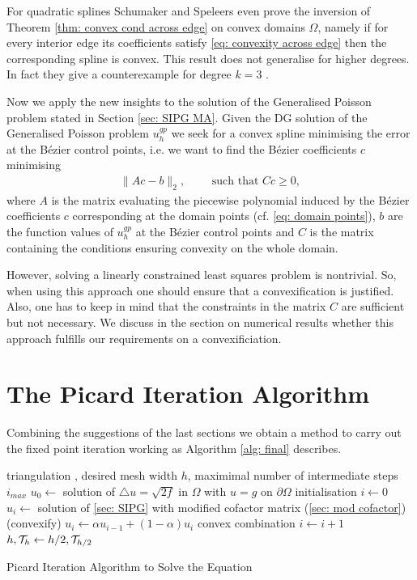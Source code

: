 For quadratic splines Schumaker and Speleers even prove the inversion of Theorem \ref{thm: convex cond across edge} on convex domains $\Omega$, namely if for every interior edge its coefficients satisfy \eqref{eq: convexity across edge} then the corresponding spline is convex.
This result does not generalise for higher degrees. In fact they give a counterexample for degree $k = 3$ \cite[Example 3.11]{SS2014}.

Now we apply the new insights to the solution of the Generalised Poisson problem stated in Section \ref{sec: SIPG MA}.
Given the DG solution of the Generalised Poisson problem $u^{gp}_h$ we seek for a convex spline minimising the error at the B\'ezier control points, i.e. we want to find the B\'ezier coefficients $c$ minimising
\begin{align}
		\lVert A c - b \rVert_2, \qquad \text{ such that } Cc \geq 0, \label{eq: convex lsq}
\end{align}
where $A$ is the matrix evaluating the piecewise polynomial induced by the B\'ezier coefficients $c$ corresponding  at the domain points (cf. \eqref{eq: domain points}), $b$ are the function values of $u^{gp}_h$ at the B\'ezier control points and $C$ is the matrix containing the conditions ensuring convexity on the whole domain.

However, solving a linearly constrained least squares problem is nontrivial. So, when using this approach one should ensure that a convexification is justified. Also, one has to keep in mind that the constraints in the matrix $C$ are sufficient but not necessary. We discuss in the section on numerical results whether this approach fulfills our requirements on a convexificiation.

\section{The Picard Iteration Algorithm} \label{sec: Picard Iteration Algo}

Combining the suggestions of the last sections we obtain a method to carry out the fixed point iteration working as Algorithm \ref{alg: final} describes.

\begin{algorithm}[H]
\begin{algorithmic}
\Require triangulation \triang, desired mesh width $h$, maximimal number of intermediate steps $i_{max}$
\State $u_0\gets $ solution of  $
	\triangle u = \sqrt{2f} \text{ in } \Omega $ with $
	u = g \text{ on }\partial \Omega$ \Comment initialisation
	\State $i \gets 0$
		\State $u_i \gets$ solution of \ref{sec: SIPG} with modified cofactor matrix (\ref{sec: mod cofactor})
		\State (convexify)
		\State $u_i \gets \alpha u_{i-1} + (1-\alpha)u_i $ \Comment convex combination
		\State $i \gets i+1$
	\EndWhile
	\State $h, \mathcal{T}_h \gets h/2, \mathcal{T}_{h/2}$
\EndWhile
\end{algorithmic}
\caption{Picard Iteration Algorithm to Solve the \MA Equation}
\label{alg: final}
\end{algorithm}


